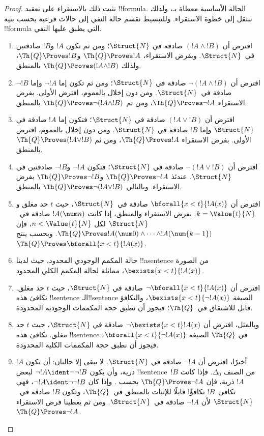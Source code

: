 \documentclass[../../../include/open-logic-section]{subfiles}
\begin{document}
\begin{proof}
نثبت ذلك بالاستقراء على تعقيد !!{formula}.
%
الحالة الأساسية معطاة بـ، ولذلك ننتقل
إلى خطوة الاستقراء. وللتبسيط نقسم حالة النفي إلى حالات فرعية بحسب
بنية !!{formula} التي يطبق عليها النفي.

\begin{enumerate}
\item افترض أن $(!A\land !B)$ صادقة في $\Struct{N}$؛ ومن ثم تكون
$!A$ و$!B$ صادقتين في~$\Struct{N}$. وبفرض الاستقراء،
$\Th{Q}\Proves !A$ و$\Th{Q}\Proves !B$، ولذلك
$\Th{Q}\Proves(!A\land !B)$ بالمنطق.
%
\item افترض أن $\lnot(!A\land !B)$ صادقة في $\Struct{N}$؛ ومن ثم
تكون إما $\lnot !A$ وإما $\lnot !B$ صادقة في~$\Struct{N}$. ومن دون
إخلال بالعموم، افترض الأولى. بفرض الاستقراء
$\Th{Q}\Proves\lnot !A$، ومن ثم
$\Th{Q}\Proves\lnot(!A\land !B)$ بالمنطق.
%
\item افترض أن $(!A\lor !B)$ صادقة في $\Struct{N}$؛ فتكون إما
$!A$ صادقة في $\Struct{N}$ وإما $!B$ صادقة في $\Struct{N}$. ومن دون إخلال
بالعموم، افترض الأولى. بفرض الاستقراء $\Th{Q}\Proves !A$، ومن ثم
$\Th{Q}\Proves(!A\lor !B)$ بالمنطق.
%
\item افترض أن $\lnot(!A\lor !B)$ صادقة في $\Struct{N}$؛ فتكون
$\lnot !A$ و$\lnot !B$ صادقتين في $\Struct{N}$. عندئذ
$\Th{Q}\Proves\lnot !A$ و$\Th{Q}\Proves\lnot !B$ بفرض
الاستقراء. وبالتالي $\Th{Q}\Proves\lnot(!A\lor !B)$ بالمنطق.
%
\item افترض أن $\bforall{x<t}{!A(x)}$ صادقة في~$\Struct{N}$، حيث
$t$ حد مغلق و$k=\Value{t}{N}$. بفرض الاستقراء والمنطق، إذا كانت
$!A(\num n)$ صادقة في~$\Struct{N}$ لكل
$n<\Value{t}{N}$، فإن
$\Th{Q}\Proves !A(\num 0)\land\dots\land !A(\num{k-1})$.
وبحسب  ينتج
$\Th{Q}\Proves\bforall{x<t}{!A(x)}$.
%
\item حالة المكمم الوجودي المحدود، حيث لدينا !!a{sentence} من الصورة
$\bexists{x<t}{!A(x)}$، مماثلة لحالة المكمم الكلي المحدود.
%
\item افترض أن $\lnot\bforall{x<t}{!A(x)}$ صادقة في
$\Struct{N}$، حيث $t$ حد مغلق. تكافئ هذه !!{sentence} الـ!!{sentence} الصيغة
$\bexists{x<t}{\lnot !A(x)}$، والتكافؤ قابل للاشتقاق في~$\Th{Q}$؛
فيجوز أن نطبق حجة المكممات الوجودية المحدودة.
%
\item وبالمثل، افترض أن $\lnot\bexists{x<t}!A(x)$ صادقة في
$\Struct{N}$، حيث $t$ حد مغلق. تكافئ هذه !!{sentence} في
$\Th{Q}$ الصيغة $\bforall{x<t}{\lnot !A(x)}$، فيجوز أن نطبق حجة
المكممات الكلية المحدودة.
%
\item أخيرًا، افترض أن $\lnot !A$ صادقة في $\Struct{N}$. لا يبقى
إلا حالتان: أن تكون $!A$ ذرية، وأن يكون
$\lnot !A\ident\lnot\lnot !B$ لبعض !!{sentence}~$!B$ من الصنف
$\Delta_0$. فإذا كانت $!A$ ذرية، فإن
$\Th{Q}\Proves\lnot !A$ بحسب . وإذا
كان $\lnot !A\ident\lnot\lnot !B$، فهي تكافئ~$!B$ تكافؤًا قابلًا
للإثبات بالمنطق في~$\Th{Q}$، وتكون $!B$ صادقة في~$\Struct{N}$ لأن
$\lnot !A$ صادقة في~$\Struct{N}$. ومن ثم يعطينا فرض الاستقراء
$\Th{Q}\Proves\lnot !A$.
\end{enumerate}
\end{proof}
\end{document}
